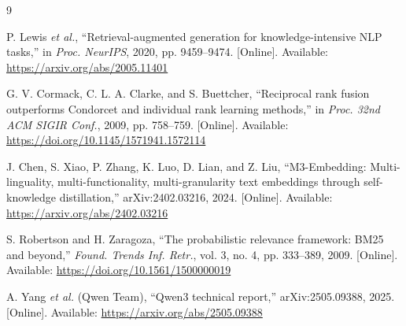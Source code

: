 \documentclass[conference]{IEEEtran}
\begin{document}
\begin{thebibliography}{9}
\footnotesize

P. Lewis \emph{et al.}, ``Retrieval-augmented generation for knowledge-intensive
NLP tasks,'' in \emph{Proc. NeurIPS}, 2020, pp. 9459--9474. [Online]. Available:
\url{https://arxiv.org/abs/2005.11401}

G. V. Cormack, C. L. A. Clarke, and S. Buettcher, ``Reciprocal rank fusion
outperforms Condorcet and individual rank learning methods,'' in \emph{Proc.
32nd ACM SIGIR Conf.}, 2009, pp. 758--759. [Online]. Available:
\url{https://doi.org/10.1145/1571941.1572114}

J. Chen, S. Xiao, P. Zhang, K. Luo, D. Lian, and Z. Liu, ``M3-Embedding:
Multi-linguality, multi-functionality, multi-granularity text embeddings through
self-knowledge distillation,'' arXiv:2402.03216, 2024. [Online]. Available:
\url{https://arxiv.org/abs/2402.03216}

S. Robertson and H. Zaragoza, ``The probabilistic relevance framework: BM25 and
beyond,'' \emph{Found. Trends Inf. Retr.}, vol. 3, no. 4, pp. 333--389, 2009.
[Online]. Available: \url{https://doi.org/10.1561/1500000019}

A. Yang \emph{et al.} (Qwen Team), ``Qwen3 technical report,'' arXiv:2505.09388,
2025. [Online]. Available: \url{https://arxiv.org/abs/2505.09388}

\end{thebibliography}
\end{document}
